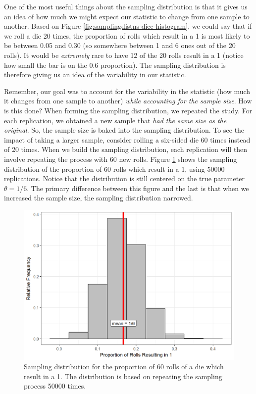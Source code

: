 \documentclass[]{book}
\theoremstyle{plain}
\theoremstyle{mydefn}
\theoremstyle{myexmpl}
\theoremstyle{remark}
\begin{document}
One of the most useful things about the sampling distribution is that it
gives us an idea of how much we might expect our statistic to change
from one sample to another. Based on Figure
\ref{fig:samplingdistns-dice-histogram}, we could say that if we roll a
die 20 times, the proportion of rolls which result in a 1 is most likely
to be between 0.05 and 0.30 (so somewhere between 1 and 6 ones out of
the 20 rolls). It would be \emph{extremely} rare to have 12 of the 20
rolls result in a 1 (notice how small the bar is on the 0.6 proportion).
The sampling distribution is therefore giving us an idea of the
variability in our statistic.

Remember, our goal was to account for the variability in the statistic
(how much it changes from one sample to another) \emph{while accounting
for the sample size}. How is this done? When forming the sampling
distribution, we repeated the study. For each replication, we obtained a
new sample that \emph{had the same size as the original}. So, the sample
size is baked into the sampling distribution. To see the impact of
taking a larger sample, consider rolling a six-sided die 60 times
instead of 20 times. When we build the sampling distribution, each
replication will then involve repeating the process with 60 new rolls.
Figure \ref{fig:samplingdistns-dice-histogram2} shows the sampling
distribution of the proportion of 60 rolls which result in a 1, using
50000 replications. Notice that the distribution is still centered on
the true parameter \(\theta = 1/6\). The primary difference between this
figure and the last is that when we increased the sample size, the
sampling distribution narrowed.

\begin{figure}

{\centering \includegraphics[width=0.8\linewidth]{./Images/samplingdistns-dice-histogram2-1} 

}

\caption{Sampling distribution for the proportion of 60 rolls of a die which result in a 1.  The distribution is based on repeating the sampling process 50000 times.}\label{fig:samplingdistns-dice-histogram2}
\end{figure}
\end{document}
